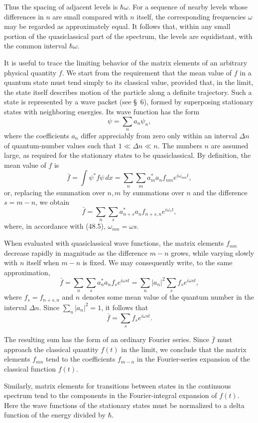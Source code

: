 Thus the spacing of adjacent levels is $\hbar\omega$. For a sequence of
nearby levels whose differences in $n$ are small compared with $n$ itself,
the corresponding frequencies $\omega$ may be regarded as approximately
equal. It follows that, within any small portion of the quasiclassical part of
the spectrum, the levels are equidistant, with the common interval
$\hbar\omega$.

It is useful to trace the limiting behavior of the matrix elements of an
arbitrary physical quantity $f$. We start from the requirement that the mean
value of $f$ in a quantum state must tend simply to its classical value,
provided that, in the limit, the state itself describes motion of the particle
along a definite trajectory. Such a state is represented by a wave packet
(see §~6), formed by superposing stationary states with neighboring energies.
Its wave function has the form
\[
  \psi=\sum_n a_n\psi_n,
\]
where the coefficients $a_n$ differ appreciably from zero only within an
interval $\Delta n$ of quantum-number values such that
$1\ll\Delta n\ll n$. The numbers $n$ are assumed large, as required for the
stationary states to be quasiclassical. By definition, the mean value of $f$
is
\[
  \bar f=\int\psi^*f\psi\,dx
  =\sum_n\sum_m a_m^*a_nf_{mn}e^{i\omega_{mn}t},
\]
or, replacing the summation over $n,m$ by summations over $n$ and the
difference $s=m-n$, we obtain
\[
  \bar f=\sum_n\sum_s a_{n+s}^*a_nf_{n+s,n}e^{i\omega_st},
\]
where, in accordance with (48.5), $\omega_{mn}=\omega s$.

When evaluated with quasiclassical wave functions, the matrix elements
$f_{mn}$ decrease rapidly in magnitude as the difference $m-n$ grows, while
varying slowly with $n$ itself when $m-n$ is fixed. We may consequently write,
to the same approximation,
\[
  \bar f=\sum_n\sum_s a_n^*a_nf_se^{i\omega st}
  =\sum_n|a_n|^2\sum_sf_se^{i\omega st},
\]
where $f_s=f_{n+s,n}$ and $n$ denotes some mean value of the quantum number in
the interval $\Delta n$. Since $\sum_n|a_n|^2=1$, it follows that
\[
  \bar f=\sum_sf_se^{i\omega st}.
\]

The resulting sum has the form of an ordinary Fourier series. Since $\bar f$
must approach the classical quantity $f(t)$ in the limit, we conclude that
the matrix elements $f_{mn}$ tend to the coefficients $f_{m-n}$ in the
Fourier-series expansion of the classical function $f(t)$.

Similarly, matrix elements for transitions between states in the continuous
spectrum tend to the components in the Fourier-integral expansion of $f(t)$.
Here the wave functions of the stationary states must be normalized to a
delta function of the energy divided by $\hbar$.

